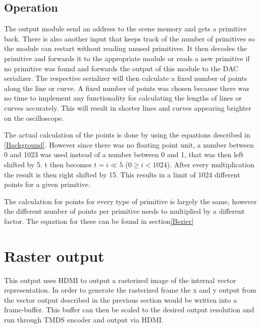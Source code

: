 \subsection{Operation}

The output module send an address to the scene memory and gets a primitive back.
There is also another input that keeps track of the number of primitives so the module can restart without reading unused primitives.
It then decodes the primitive and forwards it to the appropriate module or reads a new primitive if no primitive was found and forwards the output of this module to the DAC serializer.
The respective serializer will then calculate a fixed number of points along the line or curve.
A fixed number of points was chosen because there was no time to implement any functionality for calculating the lengths of lines or curves accurately.
This will result in shorter lines and curves appearing brighter on the oscilloscope.

The actual calculation of the points is done by using the equations described in \ref{Background}.
However since there was no floating point unit, a number between 0 and 1023 was used instead of a number between 0 and 1, that was then left shifted by 5.
t then becomes \(t = i \ll 5\) (\(0 \geq i < 1024\)). 
After every multiplication the result is then right shifted by 15.
This results in a limit of 1024 different points for a given primitive.

The calculation for points for every type of primitive is largely the same, however the different number of points per primitive needs to multiplied by a different factor. 
The equation for these can be found in section\ref{Bezier}

\section{Raster output}

This output uses HDMI to output a rasterized image of the internal vector representation.
In order to generate the rasterized frame the x and y output from the vector output described in the previous section would be written into a frame-buffer.
This buffer can then be scaled to the desired output resolution and run through TMDS encoder and output via HDMI.